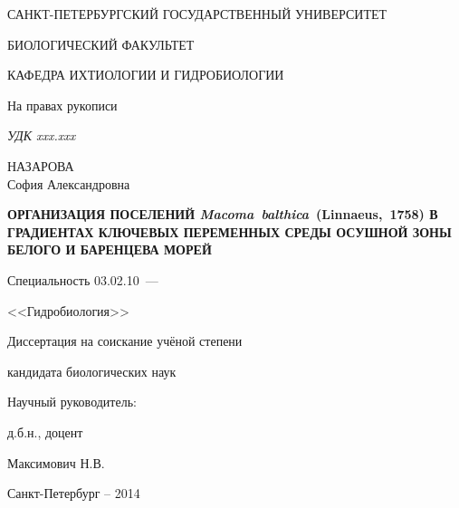 \thispagestyle{empty}

\begin{center}
САНКТ-ПЕТЕРБУРГСКИЙ ГОСУДАРСТВЕННЫЙ УНИВЕРСИТЕТ\par
БИОЛОГИЧЕСКИЙ ФАКУЛЬТЕТ\par
КАФЕДРА ИХТИОЛОГИИ И ГИДРОБИОЛОГИИ\par  
\par
\end{center}

\vspace{20mm}
\begin{flushright}
На правах рукописи

{\sl УДК xxx.xxx}
\end{flushright}

\vspace{30mm}
\begin{center}
{\large НАЗАРОВА\\ София Александровна}
\end{center}

\vspace{5mm}
\begin{center}
{\bfseries \large ОРГАНИЗАЦИЯ ПОСЕЛЕНИЙ {\itshape Macoma~balthica}~(Linnaeus,~1758) В ГРАДИЕНТАХ КЛЮЧЕВЫХ ПЕРЕМЕННЫХ СРЕДЫ ОСУШНОЙ ЗОНЫ БЕЛОГО И БАРЕНЦЕВА МОРЕЙ
\par}

\vspace{10mm}
{%
Специальность 03.02.10~---

<<Гидробиология>>
}

\vspace{10mm}
Диссертация на соискание учёной степени

кандидата биологических наук
\end{center}

\vspace{20mm}
\begin{flushright}
Научный руководитель:

д.б.н., доцент

Максимович Н.В.

\end{flushright}

\vspace{20mm}
\begin{center}
{Санкт-Петербург  -- 2014}
\end{center}

\newpage
